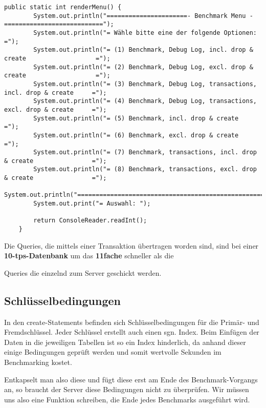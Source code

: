 \begin{lstlisting}[caption={Renderer für das Konsolen Menü}]
	public static int renderMenu() {
		System.out.println("======================- Benchmark Menu -===========================");
		System.out.println("= Wähle bitte eine der folgende Optionen:                         =");
		System.out.println("= (1) Benchmark, Debug Log, incl. drop & create                   =");
		System.out.println("= (2) Benchmark, Debug Log, excl. drop & create                   =");
		System.out.println("= (3) Benchmark, Debug Log, transactions, incl. drop & create     =");
		System.out.println("= (4) Benchmark, Debug Log, transactions, excl. drop & create     =");
		System.out.println("= (5) Benchmark, incl. drop & create                              =");
		System.out.println("= (6) Benchmark, excl. drop & create                              =");
		System.out.println("= (7) Benchmark, transactions, incl. drop & create                =");
		System.out.println("= (8) Benchmark, transactions, excl. drop & create                =");
		System.out.println("===================================================================");
		System.out.print("= Auswahl: ");
		
		return ConsoleReader.readInt();
	}
\end{lstlisting}

 
Die Queries, die mittels einer Transaktion übertragen worden sind, sind bei
einer \textbf{10-tps-Datenbank} um \ca das \textbf{11fache} schneller als die

Queries die einzelnd zum Server geschickt werden.

\subsection{Schlüsselbedingungen}
In den create-Statements befinden sich Schlüsselbedingungen für die Primär- und
Fremdschlüssel. Jeder Schlüssel erstellt auch einen sgn. Index. Beim Einfügen
der Daten in die jeweiligen Tabellen ist so ein Index hinderlich, da anhand
dieser einige Bedingungen geprüft werden und somit wertvolle Sekunden im
Benchmarking kostet.

Entkapselt man also diese und fügt diese erst am Ende des Benchmark-Vorgangs
an, so braucht der Server diese Bedingungen nicht zu überprüfen. Wir müssen uns
also eine Funktion schreiben, die Ende jedes Benchmarks ausgeführt wird.

